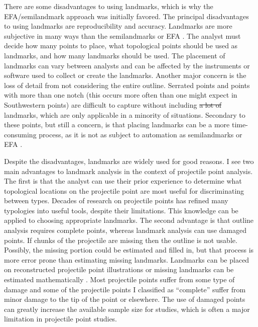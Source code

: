 \documentclass[a4paper]{article}
\providecommand{\DIFadd}[1]{{\protect\color{blue}\uwave{#1}}} %
\providecommand{\DIFdel}[1]{{\protect\color{red}\sout{#1}}}                      %
\providecommand{\DIFaddbegin}{} %
\providecommand{\DIFaddend}{} %
\providecommand{\DIFdelbegin}{} %
\providecommand{\DIFdelend}{} %
\begin{document}
There are some disadvantages to using landmarks, which is why the EFA/semilandmark approach was initially favored. The principal disadvantages to using landmarks are reproducibility and accuracy. Landmarks are more subjective in many ways than the semilandmarks or EFA \autocite[see][205]{Shott2010-fn}. The analyst must decide how many points to place, what topological points should be used as landmarks, and how many landmarks should be used. The placement of landmarks can vary between analysts and can be affected by the instruments or software used to collect or create the landmarks. Another major concern is the loss of detail from not considering the entire outline. Serrated \DIFaddbegin \DIFadd{projectile }\DIFaddend points and points with more than one notch (this occurs more often than one might expect in Southwestern \DIFaddbegin \DIFadd{projectile }\DIFaddend points) are difficult to capture without including \DIFdelbegin \DIFdel{a lot of }\DIFdelend \DIFaddbegin \DIFadd{many }\DIFaddend landmarks, which are only applicable in a minority of situations. Secondary to these points, but still a concern, is that placing landmarks can be a more time-consuming process, as it is not as \DIFaddbegin \DIFadd{easily }\DIFaddend subject to automation as semilandmarks or EFA \DIFaddbegin \autocite[although see][ for one of several examples of automation]{Palaniswamy2010-sl}\DIFaddend .

Despite the disadvantages, landmarks are widely used for good reasons. I see two main advantages to landmark analysis in the context of projectile point analysis. The first is that the analyst can use their prior experience to determine what topological locations on the projectile point are most useful for discriminating between types. Decades of research on projectile points has refined many typologies into useful tools, despite their limitations. This knowledge can be applied to choosing appropriate landmarks. The second advantage is that outline analysis requires complete \DIFaddbegin \DIFadd{projectile }\DIFaddend points, whereas landmark analysis can use damaged points. If chunks of the projectile are missing then the outline is not usable. Possibly, the missing portion could be estimated and filled in, but that process is more error prone than estimating missing landmarks. Landmarks can be placed on reconstructed projectile point illustrations or missing landmarks can be estimated mathematically \autocite{Gunz2009-yb}. Most projectile points suffer from some type of damage and some of the projectile points I classified as ``complete'' suffer from minor damage to the tip of the point or elsewhere. The use of damaged points can greatly increase the available sample size for studies, which is often a major limitation in projectile point studies.
\end{document}
